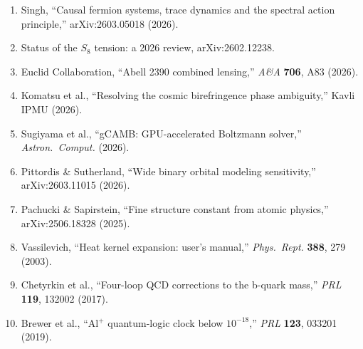 \documentclass[11pt,a4paper]{article}
\begin{document}
\begin{enumerate}
\item Singh, ``Causal fermion systems, trace dynamics and the spectral action principle,'' arXiv:2603.05018 (2026).
\item Status of the $S_8$ tension: a 2026 review, arXiv:2602.12238.
\item Euclid Collaboration, ``Abell 2390 combined lensing,'' \textit{A\&A} \textbf{706}, A83 (2026).
\item Komatsu et al., ``Resolving the cosmic birefringence phase ambiguity,'' Kavli IPMU (2026).
\item Sugiyama et al., ``gCAMB: GPU-accelerated Boltzmann solver,'' \textit{Astron.\ Comput.} (2026).
\item Pittordis \& Sutherland, ``Wide binary orbital modeling sensitivity,'' arXiv:2603.11015 (2026).
\item Pachucki \& Sapirstein, ``Fine structure constant from atomic physics,'' arXiv:2506.18328 (2025).
\item Vassilevich, ``Heat kernel expansion: user's manual,'' \textit{Phys.\ Rept.} \textbf{388}, 279 (2003).
\item Chetyrkin et al., ``Four-loop QCD corrections to the b-quark mass,'' \textit{PRL} \textbf{119}, 132002 (2017).
\item Brewer et al., ``Al$^+$ quantum-logic clock below $10^{-18}$,'' \textit{PRL} \textbf{123}, 033201 (2019).
\end{enumerate}
\end{document}
